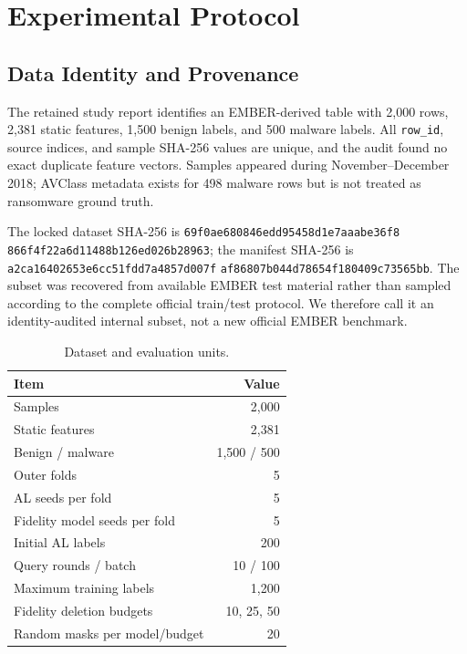 \section{Experimental Protocol}
\label{sec:protocol}

\subsection{Data Identity and Provenance}

The retained study report identifies an EMBER-derived table with 2,000 rows,
2,381 static features, 1,500 benign labels, and 500 malware labels. All
\texttt{row\_id}, source indices, and sample SHA-256 values are unique, and the
audit found no exact duplicate feature vectors. Samples appeared during
November--December 2018; AVClass metadata exists for 498 malware rows but is not
treated as ransomware ground truth.

The locked dataset SHA-256 is
\texttt{69f0ae680846edd95458d1e7aaabe36f8}\-
\texttt{866f4f22a6d11488b126ed026b28963}; the manifest SHA-256 is
\texttt{a2ca16402653e6cc51fdd7a4857d007f}\-
\texttt{af86807b044d78654f180409c73565bb}. The subset was recovered from available
EMBER test material rather than sampled according to the complete official
train/test protocol. We therefore call it an identity-audited internal subset,
not a new official EMBER benchmark.

\begin{table}[t]
\centering
\caption{Dataset and evaluation units.}
\label{tab:data}
\small
\begin{tabular}{lr}
\toprule
Item & Value \\
\midrule
Samples & 2,000 \\
Static features & 2,381 \\
Benign / malware & 1,500 / 500 \\
Outer folds & 5 \\
AL seeds per fold & 5 \\
Fidelity model seeds per fold & 5 \\
Initial AL labels & 200 \\
Query rounds / batch & 10 / 100 \\
Maximum training labels & 1,200 \\
Fidelity deletion budgets & 10, 25, 50 \\
Random masks per model/budget & 20 \\
\bottomrule
\end{tabular}
\end{table}

